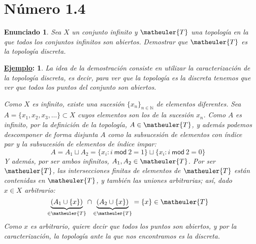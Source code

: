 \documentclass[10pt,a4paper,openright]{book}
\theoremstyle{break}
\newtheorem*{enun}{Enunciado}
\newtheorem*{ej}{\underline{Ejemplo}:}
\begin{document}
\section{Número 1.4}
\begin{enun}
Sea $X$ un conjunto infinito y $\matheuler{T}$ una topología en la que todos los conjuntos infinitos son abiertos. Demostrar que $\matheuler{T}$ es la topología discreta.
\end{enun}
\begin{ej}
La idea de la demostración consiste en utilizar la caracterización de la topología discreta, es decir, para ver que la topología es la discreta tenemos que ver que todos los puntos del conjunto son abiertos.

Como $X$ es infinito, existe una sucesión $\{x_n\}_{n \in \mathbb{N}}$ de elementos diferentes. Sea $A = \{x_1, x_2,x_3,\ldots \} \subset X$ cuyos elementos son los de la sucesión $x_n$. Como $A$ es infinito, por la definición de la topología, $A \in \matheuler{T}$, y además podemos descomponer de forma disjunta $A$ como la subsucesión de elementos con índice par y la subsucesión de elementos de índice impar:
$$A = A_1 \sqcup A_2 = \{x_i : i \ \mathsf{mod} \ 2 = 1\} \sqcup \{x_i : i\  \mathsf{mod} \ 2 = 0\}$$
Y además, por ser ambos infinitos, $A_1, A_2 \in \matheuler{T}$. Por ser $\matheuler{T}$, las intersecciones finitas de elementos de $\matheuler{T}$ están contenidas en $\matheuler{T}$, y también las uniones arbitrarias; así, dado $x \in X$ arbitrario:
$$\underbrace{(A_1 \cup \{x\})}_{\in \matheuler{T}} \cap \underbrace{(A_2 \cup \{x\})}_{\in \matheuler{T}} = \{x\} \in \matheuler{T}$$
Como $x$ es arbitrario, quiere decir que todos los puntos son abiertos, y por la caracterización, la topología ante la que nos encontramos es la discreta.
\end{ej}
\end{document}

